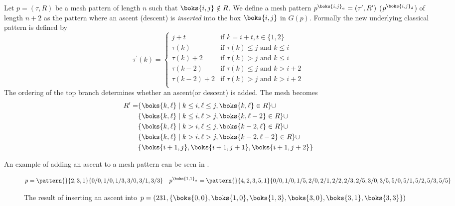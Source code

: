 \begin{definition}
Let \(p=(\tau,R)\) be a mesh pattern of length \(n\) such that
\(\boks{i,j}\notin R\). We define a mesh pattern \(p^{\boks{i,j}_a} =
(\tau^\prime,R^\prime)\) (\(p^{\boks{i,j}_d}\)) of length \(n+2\) as the pattern
where an ascent (descent) is \emph{inserted} into the box \(\boks{i,j}\) in
\(G(p)\). Formally the new underlying classical pattern is defined by
\begin{equation*}
\tau^\prime(k) = \begin{cases}
    j+t & \text{if } k = i+t,t\in\{1,2\}\\
    \tau(k) & \text{if } \tau(k)\le j \text{ and }k\le i\\
    \tau(k)+2 & \text{if } \tau(k)> j \text{ and }k\le i\\
    \tau(k-2) & \text{if } \tau(k)\le j \text{ and }k> i+2\\
    \tau(k-2)+2 & \text{if } \tau(k)> j \text{ and }k> i+2\\
\end{cases}
\end{equation*}
The ordering of the top branch determines whether an ascent(or descent) is added.
The mesh becomes
\begin{equation*}
\begin{aligned}
R^\prime=&\{\boks{k,\ell}\mid k\le i, \ell\le j, \boks{k,\ell}\in R\} \cup\\
&\{\boks{k,\ell}\mid k\le i, \ell > j, \boks{k,\ell-2}\in R\}\cup\\
&\{\boks{k,\ell}\mid k > i, \ell \le j, \boks{k-2,\ell}\in R\}\cup\\
&\{\boks{k,\ell}\mid k > i, \ell > j, \boks{k-2,\ell-2}\in R\}\cup\\
&\{\boks{i+1,j},\boks{i+1,j+1},\boks{i+1,j+2}\}
\end{aligned}
\end{equation*}
\end{definition}
An example of adding an ascent to a mesh pattern can be seen in .
\begin{figure}
\begin{equation*}
p = \pattern{}{2,3,1}{0/0,1/0,1/3,
                      3/0,3/1,3/3} \quad
p^{\boks{1,1}_a}= \pattern{}{4,2,3,5,1}{0/0,
                        1/0,1/5,
                        2/0,2/1,2/2,2/3,2/5,
                        3/0,3/5,
                        5/0,5/1,5/2,5/3,5/5}
\end{equation*}
\caption{The result of inserting an ascent into
\(p=(231,\{\boks{0,0},\boks{1,0},\boks{1,3},\boks{3,0},\boks{3,1},\boks{3,3}\})\)}
\label{fig:adda}
\end{figure}

